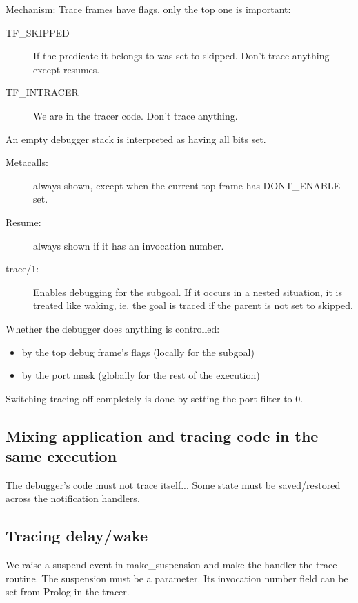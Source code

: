 Mechanism: Trace frames have flags, only the top one is important:
\begin{description}
\item[TF_SKIPPED] 
                If the predicate it belongs to was set to skipped.
                Don't trace anything except resumes.

\item[TF_INTRACER] 
                We are in the tracer code.
                Don't trace anything.
\end{description}
An empty debugger stack is interpreted as having all bits set.
\begin{description}

\item[Metacalls:]
    always shown, except when the current top frame has DONT_ENABLE set.

\item[Resume:]
    always shown if it has an invocation number.

\item[trace/1:]
    Enables debugging for the subgoal. If it occurs in a nested situation,
    it is treated like waking, ie. the goal is traced if the parent is
    not set to skipped.
\end{description}


Whether the debugger does anything is controlled:
\begin{itemize}
\item by the top debug frame's flags (locally for the subgoal)
\item by the port mask (globally for the rest of the execution)
\end{itemize}

Switching tracing off completely is done by setting the port filter to 0.


\subsection{Mixing application and tracing code in the same execution}

The debugger's code must not trace itself...
Some state must be saved/restored across the notification handlers.



\subsection{Tracing delay/wake}

We raise a suspend-event in make_suspension and make the handler
the trace routine. The suspension must be a parameter.
Its invocation number field can be set from Prolog in the tracer.


